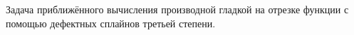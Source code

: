 \documentclass[__main__.tex]{subfiles}
\begin{document}
Задача приближённого вычисления производной гладкой на отрезке функции с помощью дефектных сплайнов третьей степени.
\end{document}
